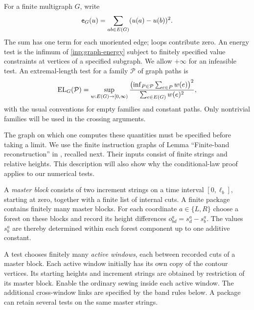 For a finite multigraph $G$, write
\begin{equation}\label{inp:graph-energy}
 \mathsf e_G(u)=\sum_{ab\in E(G)}(u(a)-u(b))^2.
\end{equation}
The sum has one term for each unoriented edge; loops contribute zero.
An energy test is the infimum of \eqref{inp:graph-energy} subject to
finitely specified value constraints at vertices of a specified
subgraph.  We allow $+\infty$ for an infeasible test.  An extremal-length
test for a family $\mathcal P$ of graph paths is
\begin{equation}\label{inp:el-test}
 \operatorname{EL}_G(\mathcal P)=
 \sup_{w:E(G)\to[0,\infty)}
 \frac{\bigl(\inf_{P\in\mathcal P}\sum_{e\in P}w(e)\bigr)^2}
      {\sum_{e\in E(G)}w(e)^2},
\end{equation}
with the usual conventions for empty families and constant paths.
Only nontrivial families will be used in the crossing arguments.

The graph on which one computes these quantities must be specified
before taking a limit.  We use the finite instruction graphs of
Lemma ``Finite-band reconstruction'' in \cite{MetricMaps}, recalled next.
Their inputs consist of finite strings and relative heights.  This
description will also show why the conditional-law proof applies to
our numerical tests.

\begin{definition}\label{inp:packages}
A \emph{master block} consists of two increment strings on a time
interval $[0,\ell_b]$, starting at zero, together with a finite list
of internal cuts.  A finite package contains finitely many master
blocks.  For each coordinate $a\in\{L,R\}$ choose a forest on these
blocks and record its height differences
$o^a_{bd}=s^a_d-s^a_b$.  The values $s^a_b$ are thereby determined
within each forest component up to one additive constant.

A test chooses finitely many \emph{active windows}, each between
recorded cuts of a master block.  Each active window initially has its
own copy of the contour vertices.  Its starting heights and increment
strings are obtained by restriction of its master block.  Enable the
ordinary sewing inside each active window.  The additional
cross-window links are specified by the band rules below.  A package
can retain several tests on the same master strings.
\end{definition}

